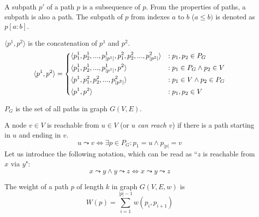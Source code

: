 \begin{definition}[Subpath]
    A subpath $p'$ of a path $p$ is a subsequence of $p$. From the properties of paths, a subpath is also a path. The subpath of $p$ from indexes $a$ to $b$ ($a \leq b)$ is denoted as $p[a:b]$.
\end{definition}
\begin{definition}
    $\langle p^1, p^2 \rangle$ is the concatenation of $p^1$ and $p^2$.
    \begin{equation*}
        \langle p^1, p^2 \rangle = \begin{dcases}
            \langle p^1_1, p^1_2,...,p^1_{|p^1|}, p^2_1,p^2_2,...,p^2_{|p^2|} \rangle & : p_1,p_2 \in P_G \\
            \langle p^1_1, p^1_2,...,p^1_{|p^1|}, p^2                         \rangle & : p_1 \in P_G \wedge p_2 \in V \\
            \langle p^1, p^2_1, p^2_2,..., p^2_{|p^2|}                        \rangle & : p_1 \in V \wedge p_2 \in P_G \\
            \langle p^1, p^2                                                  \rangle & : p_1,p_2 \in V \\
        \end{dcases}
    \end{equation*}
\end{definition}
\begin{definition}
    $P_G$ is the set of all paths in graph $G(V,E)$.
\end{definition}
\begin{definition}[Reachability]
    A node $v \in V$ is reachable from $u \in V$ (or \emph{$u$ can reach $v$}) if there is a path starting in $u$ and ending in $v$.
    \begin{equation*}
        u \leadsto v \iff \exists p \in P_G \colon p_1 = u \wedge p_{|p|} = v
    \end{equation*}
    Let us introduce the following notation, which can be read as ``$z$ is reachable from $x$ via $y$":
    \begin{equation*}
        x \leadsto y \wedge y \leadsto z \iff x \leadsto y \leadsto z
    \end{equation*}
\end{definition}
\begin{definition}
    The weight of a path $p$ of length $k$ in graph $G(V,E,w)$ is
    \begin{equation*}
        W(p) = \sum_{i=1}^{|p|-1}{w(p_i, p_{i+1})}
    \end{equation*}
\end{definition}
